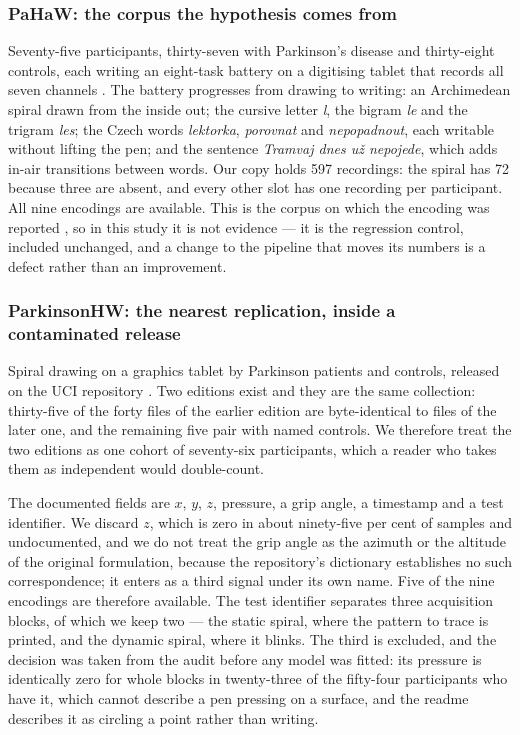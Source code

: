 

\subsubsection{PaHaW: the corpus the hypothesis comes from}
\label{sec:pahaw}

Seventy-five participants, thirty-seven with Parkinson's disease and thirty-eight controls, each
writing an eight-task battery on a digitising tablet that records all seven channels
\citep{drotar2016pahaw}. The battery progresses from drawing to writing: an Archimedean spiral
drawn from the inside out; the cursive letter \textit{l}, the bigram \textit{le} and the trigram
\textit{les}; the Czech words \textit{lektorka}, \textit{porovnat} and \textit{nepopadnout}, each
writable without lifting the pen; and the sentence \textit{Tramvaj dnes u\v{z} nepojede}, which
adds in-air transitions between words. Our copy holds 597 recordings: the spiral has 72 because
three are absent, and every other slot has one recording per participant. All nine encodings are
available. This is the corpus on which the encoding was reported \citep{prior2027minimaps}, so in
this study it is not evidence --- it is the regression control, included unchanged, and a change to
the pipeline that moves its numbers is a defect rather than an improvement.

\subsubsection{ParkinsonHW: the nearest replication, inside a contaminated release}
\label{sec:parkinsonhw}

Spiral drawing on a graphics tablet by Parkinson patients and controls, released on the UCI
repository \citep{isenkul2013parkinsonhw}. Two editions exist and they are the same collection:
thirty-five of the forty files of the earlier edition are byte-identical to files of the later one,
and the remaining five pair with named controls. We therefore treat the two editions as one cohort
of seventy-six participants, which a reader who takes them as independent would double-count.

The documented fields are $x$, $y$, $z$, pressure, a grip angle, a timestamp and a test
identifier. We discard $z$, which is zero in about ninety-five per cent of samples and undocumented,
and we do not treat the grip angle as the azimuth or the altitude of the original formulation,
because the repository's dictionary establishes no such correspondence; it enters as a third signal
under its own name. Five of the nine encodings are therefore available. The test identifier
separates three acquisition blocks, of which we keep two --- the static spiral, where the pattern
to trace is printed, and the dynamic spiral, where it blinks. The third is excluded, and the
decision was taken from the audit before any model was fitted: its pressure is identically zero for
whole blocks in twenty-three of the fifty-four participants who have it, which cannot describe a
pen pressing on a surface, and the readme describes it as circling a point rather than writing.


